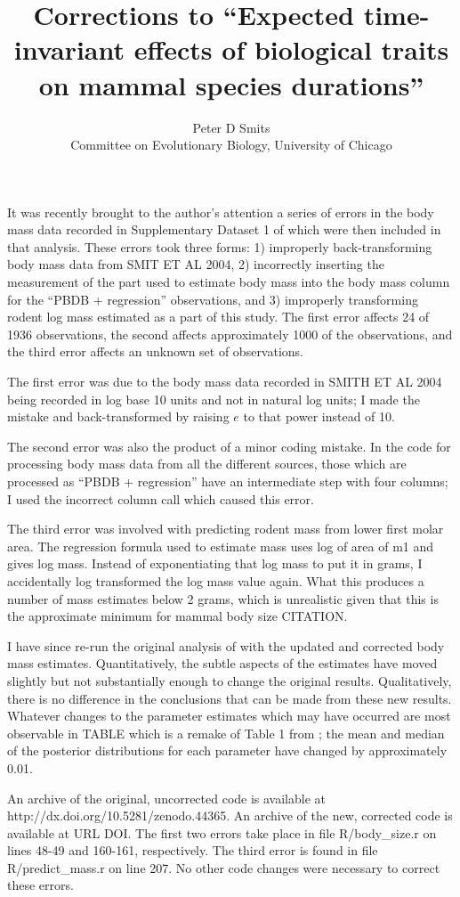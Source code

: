 \documentclass{article}
\title{Corrections to ``Expected time-invariant effects of biological traits on mammal species durations''}
\author{Peter D Smits\\Committee on Evolutionary Biology, University of Chicago}
\begin{document}
\maketitle

It was recently brought to the author's attention a series of errors in the body mass data recorded in Supplementary Dataset 1 of \citep{Smits2015} which were then included in that analysis. These errors took three forms: 1) improperly back-transforming body mass data from SMIT ET AL 2004, 2) incorrectly inserting the measurement of the part used to estimate body mass into the body mass column for the ``PBDB + regression'' observations, and 3) improperly transforming rodent log mass estimated as a part of this study. The first error affects 24 of 1936 observations, the second affects approximately 1000 of the observations, and the third error affects an unknown set of observations.

The first error was due to the body mass data recorded in SMITH ET AL 2004 being recorded in log base 10 units and not in natural log units; I made the mistake and back-transformed by raising \(e\) to that power instead of 10. 

The second error was also the product of a minor coding mistake. In the code for processing body mass data from all the different sources, those which are processed as ``PBDB + regression'' have an intermediate step with four columns; I used the incorrect column call which caused this error. 

The third error was involved with predicting rodent mass from lower first molar area. The regression formula used to estimate mass uses log of area of m1 and gives log mass. Instead of exponentiating that log mass to put it in grams, I accidentally log transformed the log mass value again. What this produces a number of mass estimates below 2 grams, which is unrealistic given that this is the approximate minimum for mammal body size CITATION. 


I have since re-run the original analysis of \citep{Smits2015} with the updated and corrected body mass estimates. Quantitatively, the subtle aspects of the estimates have moved slightly but not substantially enough to change the original results. Qualitatively, there is no difference in the conclusions that can be made from these new results. Whatever changes to the parameter estimates which may have occurred are most observable in TABLE which is a remake of Table 1 from \citet{Smits2015}; the mean and median of the posterior distributions for each parameter have changed by approximately 0.01.


An archive of the original, uncorrected code is available at http://dx.doi.org/10.5281/zenodo.44365. An archive of the new, corrected code is available at URL DOI. The first two errors take place in file R/body\_size.r on lines 48-49 and 160-161, respectively. The third error is found in file R/predict\_mass.r on line 207. No other code changes were necessary to correct these errors.




%

\end{document}
